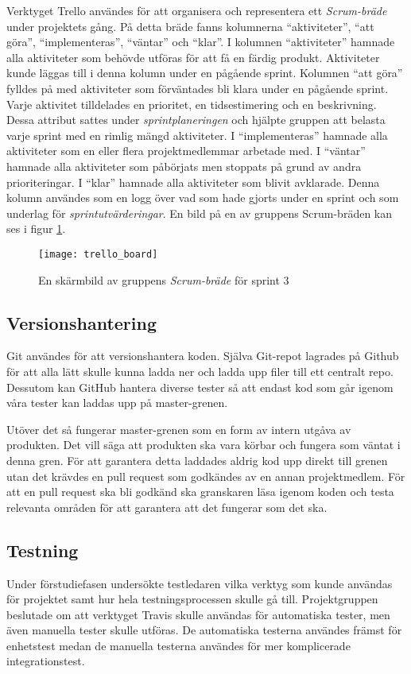 Verktyget Trello användes för att organisera och representera ett \textit{Scrum-bräde} under projektets gång. På detta bräde fanns kolumnerna ``aktiviteter'', ``att göra'', ``implementeras'', ``väntar'' och ``klar''. I kolumnen ``aktiviteter'' hamnade alla aktiviteter som behövde utföras för att få en färdig produkt. Aktiviteter kunde läggas till i denna kolumn under en pågående sprint. Kolumnen ``att göra'' fylldes på med aktiviteter som förväntades bli klara under en pågående sprint. Varje aktivitet tilldelades en prioritet, en tidsestimering och en beskrivning. Dessa attribut sattes under \textit{sprintplaneringen} och hjälpte gruppen att belasta varje sprint med en rimlig mängd aktiviteter. I ``implementeras'' hamnade alla aktiviteter som en eller flera projektmedlemmar arbetade med. I ``väntar'' hamnade alla aktiviteter som påbörjats men stoppats på grund av andra prioriteringar. I ``klar'' hamnade alla aktiviteter som blivit avklarade. Denna kolumn användes som en logg över vad som hade gjorts under en sprint och som underlag för \textit{sprintutvärderingar}. En bild på en av gruppens Scrum-bräden kan ses i figur \ref{fig:trello_board}.

\begin{figure}[h]
    \centering
    \texttt{[image: trello\_board]}
    \caption{En skärmbild av gruppens \textit{Scrum-bräde} för sprint 3}
    \label{fig:trello_board}
\end{figure}

\subsection{Versionshantering}
Git användes för att versionshantera koden. Själva Git-repot lagrades på Github för att alla lätt skulle kunna ladda ner och ladda upp filer till ett centralt repo. Dessutom kan GitHub hantera diverse tester så att endast kod som går igenom våra tester kan laddas upp på master-grenen.

Utöver det så fungerar master-grenen som en form av intern utgåva av produkten. Det vill säga att produkten ska vara körbar och fungera som väntat i denna gren. För att garantera detta laddades aldrig kod upp direkt till grenen utan det krävdes en pull request som godkändes av en annan projektmedlem. För att en pull request ska bli godkänd ska granskaren läsa igenom koden och testa relevanta områden för att garantera att det fungerar som det ska.

\subsection{Testning}
Under förstudiefasen undersökte testledaren vilka verktyg som kunde användas för projektet samt hur hela testningsprocessen skulle gå till. Projektgruppen beslutade om att verktyget Travis skulle användas för automatiska tester, men även manuella tester skulle utföras. De automatiska testerna användes främst för enhetstest medan de manuella testerna användes för mer komplicerade integrationstest.

